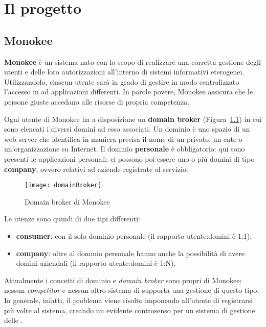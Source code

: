 \chapter{Il progetto}\label{progetto}
\section{Monokee}
\textbf{Monokee} è un sistema  nato con lo scopo di realizzare una corretta gestione degli utenti e delle loro autorizzazioni all'interno di sistemi informativi eterogenei. Utilizzandolo, ciascun utente sarà in grado di gestire in modo centralizzato l'accesso in  ad applicazioni differenti. In parole povere, Monokee assicura che le persone giuste accedano alle risorse di propria competenza.

Ogni utente di Monokee ha a disposizione un \textbf{domain broker} (Figura~\ref{fig:domainBroker}) in cui sono elencati i diversi domini ad esso associati. Un dominio è uno spazio di un web server che identifica in maniera precisa il nome di un privato, un ente o un'organizzazione su Internet. Il dominio \textbf{personale} è obbligatorio: qui sono presenti le applicazioni personali; ci possono poi essere uno o più domini di tipo \textbf{company}, ovvero relativi ad aziende registrate al servizio. 

\begin{figure}[hbpc]
\begin{center}
\texttt{[image: domainBroker]}
\caption{Domain broker di Monokee}
\label{fig:domainBroker}
\end{center}
\end{figure}

Le utenze sono quindi di due tipi differenti:
\begin{itemize}
\item \textbf{consumer}: con il solo dominio personale (il rapporto utente:domini è 1:1);
\item \textbf{company}: oltre al dominio personale hanno anche la possibilità di avere domini aziendali (il rapporto utente:domini è 1:N). 
\end{itemize}
Attualmente i concetti di dominio e \textit{domain broker} sono propri di Monokee: nessun \textit{competitor} e nessun altro sistema di  supporta una gestione di questo tipo. In generale, infatti, il problema viene risolto imponendo all'utente di registrarsi più volte al sistema, creando un evidente controsenso per un sistema di gestione delle .

